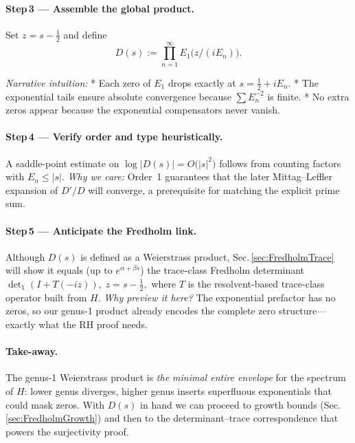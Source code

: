 \documentclass[11pt]{article}
\begin{document}
\vspace{0.4em}
\paragraph{Step\,3 — Assemble the global product.}

Set \(z=s-\tfrac12\) and define
\[
   D(s)
   := \prod_{n=1}^{\infty} E_{1}\!\bigl( z/(iE_{n}) \bigr).
\]

\emph{Narrative intuition:}  
* Each zero of \(E_{1}\) drops exactly at \(s=\tfrac12+iE_{n}\).  
* The exponential tails ensure absolute convergence because
  $\sum E_{n}^{-2}$ is finite.  
* No extra zeros appear because the exponential compensators never
  vanish.

\vspace{0.4em}
\paragraph{Step\,4 — Verify order and type heuristically.}

A saddle-point estimate on
\(
   \log|D(s)|
 = O\!\bigl(|s|^{2}\bigr)
\)
follows from counting factors with \(E_{n}\le|s|\).
\emph{Why we care:}  
Order~1 guarantees that the later Mittag–Leffler expansion of
$D'/D$ will converge, a prerequisite for matching the explicit prime
sum.

\vspace{0.4em}
\paragraph{Step\,5 — Anticipate the Fredholm link.}

Although $D(s)$ is defined as a Weierstrass product, Sec.\,\ref{sec:FredholmTrace}
will show it equals (up to $e^{\alpha+\beta s}$) the trace-class
Fredholm determinant
\(
   \det\nolimits_{1}(I+T(-i z)),
\;
 z=s-\tfrac12,
\)
where \(T\) is the resolvent-based trace-class operator built from $H$.
\emph{Why preview it here?}  
The exponential prefactor has no zeros, so our genus-1 product already
encodes the complete zero structure—exactly what the RH proof needs.

\vspace{0.4em}
\paragraph{Take-away.}
The genus-1 Weierstrass product is \emph{the minimal entire envelope}
for the spectrum of \(H\):  
lower genus diverges, higher genus inserts superfluous
exponentials that could mask zeros.  
With $D(s)$ in hand we can proceed to growth bounds (Sec.\,\ref{sec:FredholmGrowth})
and then to the determinant–trace correspondence that powers the
surjectivity proof.
\end{document}
